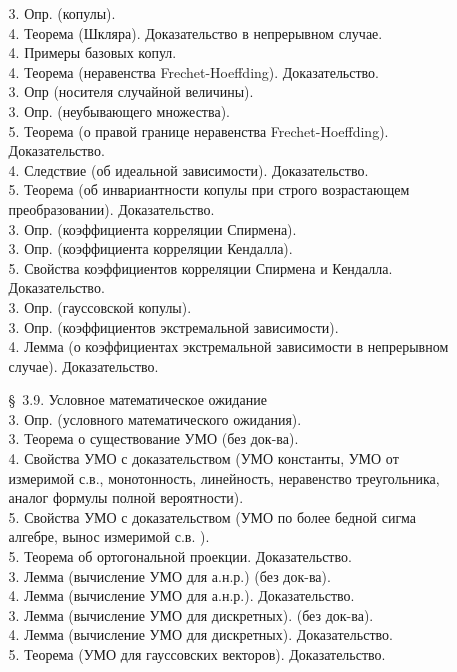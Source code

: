 \documentclass[10pt]{amsart}
\begin{document}
\begin{enumerate}
\begin{enumerate}
3. Опр. (копулы). \\
4. Теорема (Шкляра). Доказательство в непрерывном случае. \\
4. Примеры базовых копул. \\
4. Теорема (неравенства Frechet-Hoeffding). Доказательство. \\
3. Опр (носителя случайной величины). \\
3. Опр. (неубывающего множества). \\
5. Теорема (о правой границе неравенства Frechet-Hoeffding).  Доказательство. \\
4. Следствие (об идеальной зависимости). Доказательство. \\
5. Теорема (об инвариантности копулы при строго возрастающем преобразовании). Доказательство. \\
3. Опр. (коэффициента корреляции Спирмена). \\
3. Опр. (коэффициента корреляции Кендалла). \\
5. Свойства коэффициентов корреляции Спирмена и Кендалла. Доказательство. \\ 
3. Опр. (гауссовской копулы). \\
3. Опр. (коэффициентов экстремальной зависимости). \\
4. Лемма (о коэффициентах экстремальной зависимости в непрерывном случае). Доказательство. \\
 
 
 
 
\item[\S\, 3.9.] Условное математическое ожидание \\
3. Опр. (условного математического ожидания). \\
3. Теорема о существование УМО (без док-ва). \\
4. Свойства УМО с доказательством (УМО константы, УМО от измеримой с.в., монотонность,  линейность, неравенство треугольника,  аналог формулы полной вероятности). \\
5. Свойства УМО с доказательством (УМО по более бедной сигма алгебре, вынос измеримой с.в. ). \\
5. Теорема об ортогональной проекции. Доказательство. \\
3. Лемма (вычисление УМО для а.н.р.)  (без док-ва). \\
4. Лемма (вычисление УМО для а.н.р.). Доказательство. \\
3. Лемма (вычисление УМО для дискретных). (без док-ва). \\
4. Лемма (вычисление УМО для дискретных). Доказательство. \\
5. Теорема (УМО для гауссовских векторов). Доказательство. \\


\end{enumerate}
\end{enumerate}
\end{document}
